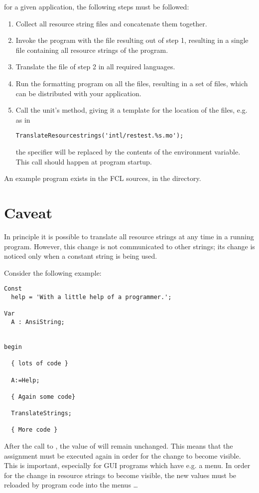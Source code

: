 {for a given application, the following steps must be followed:
\begin{enumerate}
\item Collect all resource string files and concatenate them together.
\item Invoke the  program with the file resulting out of step
1, resulting in a single  file containing all resource strings of
the program.
\item Translate the  file of step 2 in all required languages.
\item Run the  formatting program on all the  files,
resulting in a set of  files, which can be distributed with your
application.
\item Call the  unit's  method,
giving it a template for the location of the  files, e.g. as in
\begin{verbatim}
TranslateResourcestrings('intl/restest.%s.mo');
\end{verbatim}
the  specifier will be replaced by the contents of the 
environment variable. This call should happen at program startup.
\end{enumerate}
An example program exists in the FCL sources, in the 
directory.
\section{Caveat}
In principle it is possible to translate all resource strings at any time in
a running program. However, this change is not communicated to other
strings; its change is noticed only when a constant string is being used.

Consider the following example:
\begin{verbatim}
Const
  help = 'With a little help of a programmer.';

Var
  A : AnsiString;


begin

  { lots of code }

  A:=Help;

  { Again some code}

  TranslateStrings;

  { More code }
\end{verbatim}
After the call to , the value of  will remain
unchanged. This means that the assignment  must be executed
again in order for the change to become visible. This is important,
especially for GUI programs which have e.g. a menu. In order for the
change in resource strings to become visible, the new values must be
reloaded by program code into the menus \dots

}
